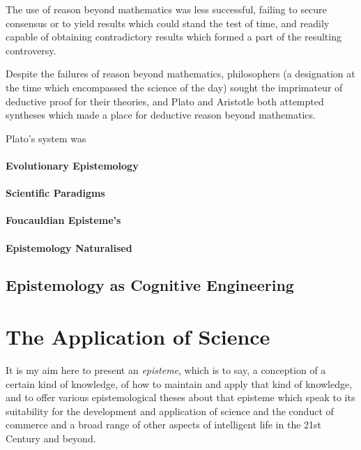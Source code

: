 \documentclass[10pt,titlepage]{book}
\begin{document}
The use of reason beyond mathematics was less successful, failing to secure consensus or to yield results which could stand the test of time, and readily capable of obtaining contradictory results which formed a part of the resulting controversy.

Despite the failures of reason beyond mathematics, philosophers (a designation at the time which encompassed the science of the day) sought the imprimateur of deductive proof for their theories, and Plato and Aristotle both attempted syntheses which made a place for deductive reason beyond mathematics.

Plato's system was 



\paragraph{Evolutionary Epistemology}

\paragraph{Scientific Paradigms}

\paragraph{Foucauldian Episteme's}

\paragraph{Epistemology Naturalised}

\subsection{Epistemology as Cognitive Engineering}

\section{The Application of Science}

It is my aim here to present an \emph{episteme}, which is to say, a conception of a certain kind of knowledge, of how to maintain and apply that kind of knowledge, and to offer various epistemological theses about that episteme which speak to its suitability for the development and application of science and the conduct of commerce and a broad range of other aspects of intelligent life in the 21st Century and beyond.
\end{document}
